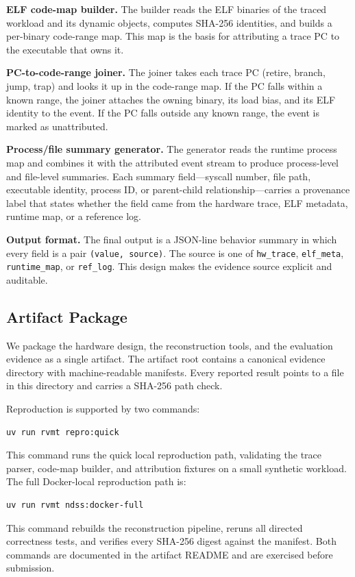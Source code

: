 \textbf{ELF code-map builder.} The builder reads the ELF binaries of the traced workload and its dynamic objects, computes SHA-256 identities, and builds a per-binary code-range map. This map is the basis for attributing a trace PC to the executable that owns it.

\textbf{PC-to-code-range joiner.} The joiner takes each trace PC (retire, branch, jump, trap) and looks it up in the code-range map. If the PC falls within a known range, the joiner attaches the owning binary, its load bias, and its ELF identity to the event. If the PC falls outside any known range, the event is marked as unattributed.

\textbf{Process/file summary generator.} The generator reads the runtime process map and combines it with the attributed event stream to produce process-level and file-level summaries. Each summary field---syscall number, file path, executable identity, process ID, or parent-child relationship---carries a provenance label that states whether the field came from the hardware trace, ELF metadata, runtime map, or a reference log.

\textbf{Output format.}
The final output is a JSON-line behavior summary in which every field is a pair \texttt{(value, source)}. The source is one of \texttt{hw\_trace}, \texttt{elf\_meta}, \texttt{runtime\_map}, or \texttt{ref\_log}. This design makes the evidence source explicit and auditable.

\subsection{Artifact Package}
\label{subsec:artifact-package}

We package the hardware design, the reconstruction tools, and the evaluation evidence as a single artifact. The artifact root contains a canonical evidence directory with machine-readable manifests. Every reported result points to a file in this directory and carries a SHA-256 path check.

Reproduction is supported by two commands:

\begin{verbatim}
uv run rvmt repro:quick
\end{verbatim}

This command runs the quick local reproduction path, validating the trace parser, code-map builder, and attribution fixtures on a small synthetic workload. The full Docker-local reproduction path is:

\begin{verbatim}
uv run rvmt ndss:docker-full
\end{verbatim}

This command rebuilds the reconstruction pipeline, reruns all directed correctness tests, and verifies every SHA-256 digest against the manifest. Both commands are documented in the artifact README and are exercised before submission.
